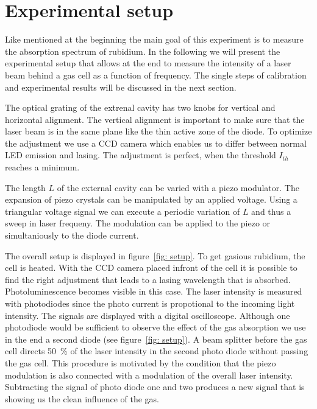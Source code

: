 \section{Experimental setup}
Like mentioned at the beginning the main goal of this experiment is to measure the absorption spectrum of rubidium.
In the following we will present the experimental setup that allows at the end to measure the intensity of a laser beam
behind a gas cell as a function of frequency. The single steps of calibration and experimental results will be discussed
in the next section. 

The optical grating of the extrenal cavity has two knobs for vertical and horizontal alignment. The vertical alignment 
is important to make sure that the laser beam is in the same plane like the thin active zone of the diode. To optimize the adjustment 
we use a CCD camera which enables us to differ between normal LED emission and lasing. The adjustment is perfect, when the 
threshold $I_{th}$ reaches a minimum. 

The length $L$ of the external cavity can be varied with a piezo modulator. The expansion of piezo crystals can be manipulated by an
applied voltage. Using a triangular voltage signal we can execute a periodic variation of $L$ and thus a sweep in laser frequeny. The
modulation can be applied to the piezo or simultaniously to the diode current.

The overall setup is displayed in figure~\ref{fig: setup}. To get gasious 
rubidium, the cell is heated. With the CCD camera placed infront of the cell it is possible to find the 
right adjustment that leads to a lasing wavelength that is absorbed. Photoluminescence becomes visible in this case.  
The laser intensity is measured with photodiodes since the photo current
is propotional to the incoming light intensity. The signals are displayed with a digital oscilloscope. 
Although one photodiode would be sufficient to observe the effect of the gas absorption we use in the end 
a second diode (see figure~\ref{fig: setup}). A beam splitter before the gas cell directs \SI{50}{\percent}
of the laser intensity in the second photo diode without passing the gas cell. This procedure is motivated by the 
condition that the piezo modulation is also connected with a modulation of the overall laser intensity. Subtracting 
the signal of photo diode one and two produces a new signal that is showing us the clean influence of the gas.

